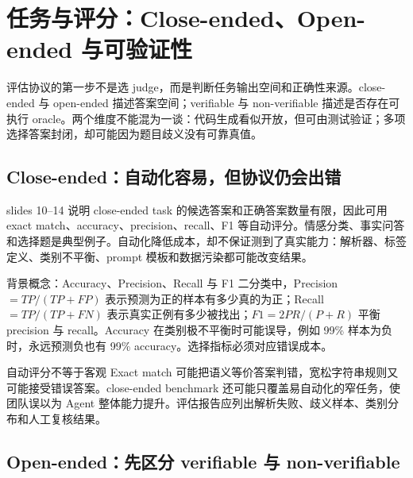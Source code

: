 \section{任务与评分：Close-ended、Open-ended 与可验证性}

评估协议的第一步不是选 judge，而是判断任务输出空间和正确性来源。close-ended 与 open-ended 描述答案空间；verifiable 与 non-verifiable 描述是否存在可执行 oracle。两个维度不能混为一谈：代码生成看似开放，但可由测试验证；多项选择答案封闭，却可能因为题目歧义没有可靠真值。

\subsection{Close-ended：自动化容易，但协议仍会出错}

slides 10--14 说明 close-ended task 的候选答案和正确答案数量有限，因此可用 exact match、accuracy、precision、recall、F1 等自动评分。情感分类、事实问答和选择题是典型例子。自动化降低成本，却不保证测到了真实能力：解析器、标签定义、类别不平衡、prompt 模板和数据污染都可能改变结果。


\begin{knowledgebox}{背景概念：Accuracy、Precision、Recall 与 F1}
二分类中，Precision $=TP/(TP+FP)$ 表示预测为正的样本有多少真的为正；Recall $=TP/(TP+FN)$ 表示真实正例有多少被找出；$F1=2PR/(P+R)$ 平衡 precision 与 recall。Accuracy 在类别极不平衡时可能误导，例如 99\% 样本为负时，永远预测负也有 99\% accuracy。选择指标必须对应错误成本。
\end{knowledgebox}

\begin{warningbox}{自动评分不等于客观}
Exact match 可能把语义等价答案判错，宽松字符串规则又可能接受错误答案。close-ended benchmark 还可能只覆盖易自动化的窄任务，使团队误以为 Agent 整体能力提升。评估报告应列出解析失败、歧义样本、类别分布和人工复核结果。
\end{warningbox}

\subsection{Open-ended：先区分 verifiable 与 non-verifiable}

